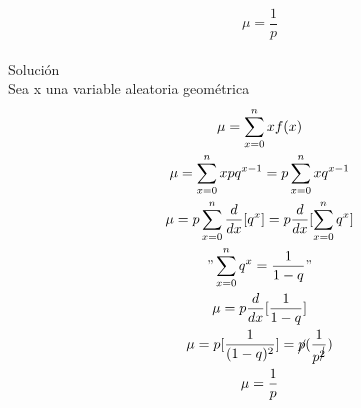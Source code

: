 \documentclass{article}
\begin{document}
$$ \mu = \frac{1}{p}$$\\
Solución\\
Sea x una variable aleatoria geométrica
\begin{gather*}
	\mu = \displaystyle\sum_{x=0}^n xf(x)\\
	\mu = \displaystyle\sum_{x=0}^n xpq^{x-1} = p \displaystyle\sum_{x=0}^n xq^{x-1}\\
	\mu = p \displaystyle\sum_{x=0}^n \frac{d}{dx}[q^x] = p \frac{d}{dx}[\displaystyle\sum_{x=0}^n q^x]\\
	 "\displaystyle\sum_{x=0}^n q^x = \frac{1}{1-q}"\\
	 \mu = p\frac{d}{dx}[\frac{1}{1-q}]\\
	 \mu = p[\frac{1}{(1-q)^2}]= \cancel{p}(\frac{1}{p^{\cancel{2}}})\\
	 \mu = \frac{1}{p}
\end{gather*}
\end{document}
